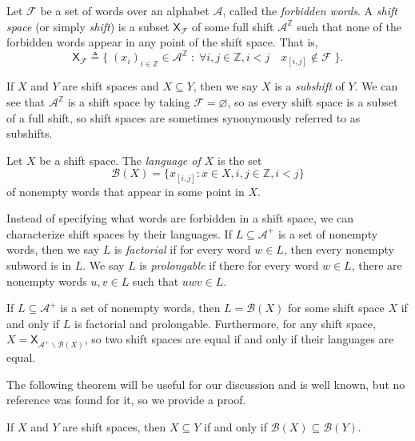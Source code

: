 \documentclass[hidelinks]{report}
\newcommand{\Ac}{\mathcal{A}}  %
\newcommand{\Bc}{\mathcal{B}}
\newcommand{\Fc}{\mathcal{F}}
\newcommand{\shift}[1]{\mathsf{X}_{#1}}
\newcommand{\term}[1]{\textit{#1}}
\theoremstyle{definition}
\begin{document}
\begin{definition}
    Let \(\Fc\) be a set of words over an alphabet \(\Ac\), called the \term{forbidden words}.
    A \term{shift space} (or simply \term{shift}) is a subset \(\shift{\Fc}\)
    of some full shift \(\Ac^\mathbb{Z}\) such that none of the forbidden words appear in any point of the shift space.
    That is,
    \[\shift{\Fc} \triangleq \big\{ \; (x_i)_{i \in \mathbb{Z}} \in \Ac^\mathbb{Z} \; : \; \forall i, j \in \mathbb{Z}, i < j \quad  x_{[i,j]} \notin \Fc \; \big\}.\]
\end{definition}

If \(X\) and \(Y\) are shift spaces and \(X \subseteq Y\), then we say \(X\) is a \term{subshift} of \(Y\).
We can see that \(\Ac^\mathbb{Z}\) is a shift space by taking \(\Fc = \varnothing\), so as 
every shift space is a subset of a full shift, so shift spaces are sometimes synonymously referred to 
as subshifts.

\begin{definition}
    Let \(X\) be a shift space. The \term{language of \(X\)} is the set 
    \[\Bc(X) = \{ x_{[i,j]} : x \in X, i, j \in \mathbb{Z}, i < j\}\]
    of nonempty words that appear in some point in \(X\).
\end{definition}

Instead of specifying what words are forbidden in a shift space, we can characterize 
shift spaces by their languages. If \(L \subseteq \Ac^+\) is a set of nonempty words, then 
we say \(L\) is \term{factorial} if for every word \(w \in L\), then every nonempty subword 
is in \(L\). We say \(L\) is \term{prolongable} if there for every word \(w \in L\), 
there are nonempty words \(u, v \in L\) such that \(uwv \in L\).

\begin{theorem}[name=\cite{lind1995introduction}]
    If \(L \subseteq \Ac^+\) is a set of nonempty words, then \(L = \Bc(X)\) for some 
    shift space \(X\) if and only if \(L\) is factorial and prolongable. 
    Furthermore, for any shift space, \(X = \shift{\Ac^+\backslash\Bc(X)}\), so 
    two shift spaces are equal if and only if their languages are equal.
\end{theorem}

The following theorem will be useful for our discussion and is well known, but no reference was found for it, so we provide a proof.

\begin{theorem}
    If \(X\) and \(Y\) are shift spaces, then \(X \subseteq Y\) if and only if \(\Bc(X) \subseteq \Bc(Y)\).
\end{theorem}
\end{document}
